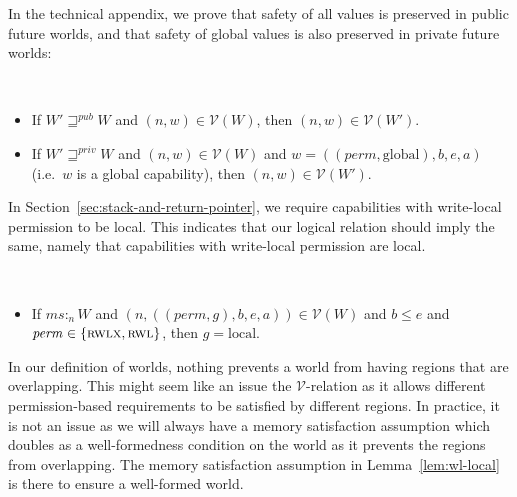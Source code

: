 \documentclass[format=acmsmall, review=true, screen=true]{acmart}
\renewcommand{\sectionname}{Section}
\newcommand{\var}[1]{\mathit{#1}}
\newcommand{\hs}{\var{ms}}
\newcommand{\ms}{\hs}
\newcommand{\gl}{\var{g}}
\newcommand{\addr}{\var{a}}
\newcommand{\start}{\var{b}}
\newcommand{\addrend}{\var{e}}
\newcommand{\heap}{\var{mem}}
\newcommand{\perm}{\var{perm}}
\newcommand{\stdcap}[1][(\perm,\gl)]{\left(#1,\start,\addrend,\addr \right)}
\newcommand{\futurewk}{\mathbin{\sqsupseteq}^{\var{pub}}}
\newcommand{\futurestr}{\mathbin{\sqsupseteq}^{\var{priv}}}
\newcommand{\heapSat}[3][\heap]{#1 :_{#2} #3}
\newcommand{\memSat}[3][n]{\heapSat[#2]{#1}{#3}}
\newcommand{\asmType}{\plaindom{AsmType}}
\newcommand{\plaindom}[1]{\mathrm{#1}}
\newcommand{\intr}[2]{\mathcal{#1}}
\newcommand{\valueintr}[1]{\intr{V}{#1}}
\newcommand{\stdvr}{\valueintr{\asmType}}
\newcommand{\npair}[2][n]{\left(#1,#2 \right)}
\newcommand{\plainperm}[1]{\textsc{#1}}
\newcommand{\readwritel}{\plainperm{rwl}}
\newcommand{\rwl}{\readwritel}
\newcommand{\rwlx}{\plainperm{rwlx}}
\newcommand{\plainlocality}[1]{\mathrm{#1}}
\newcommand{\local}{\plainlocality{local}}
\newcommand{\glob}{\plainlocality{global}}
\newenvironment{toplas}%
    {\color{OliveGreen}}{}
\begin{document}
In the technical appendix, we prove that safety of all values is
preserved in public future worlds, and that safety of global values is
also preserved in private future worlds:
\begin{lemma}~
  \begin{itemize}
  \item If $W' \futurewk W$ and $\npair{w} \in \stdvr(W)$, then $\npair{w} \in
    \stdvr(W')$.
  \item If $W' \futurestr W$ and $\npair{w} \in \stdvr(W)$ and $w =
    \stdcap[(\perm,\glob)]$ (i.e.\ $w$ is a global capability), then $\npair{w}
    \in \stdvr(W')$.
  \end{itemize}
\end{lemma}

\begin{toplas}
  In \sectionname~\ref{sec:stack-and-return-pointer}, we require capabilities with write-local permission to be local.
  This indicates that our logical relation should imply the same, namely that capabilities with write-local permission are local.
  \begin{lemma}~
    \label{lem:wl-local}
    \begin{itemize}
    \item If $\memSat{\ms}{W}$ and $\npair{\stdcap} \in \stdvr(W)$ and $\start
      \leq \addrend$ and $\perm \in \{\rwlx,\rwl\}$, then $\gl = \local$.
    \end{itemize}
  \end{lemma}
  In our definition of worlds, nothing prevents a world from having regions that are overlapping.
  This might seem like an issue the $\stdvr$-relation as it allows different permission-based requirements to be satisfied by different regions.
  In practice, it is not an issue as we will always have a memory satisfaction assumption which doubles as a well-formedness condition on the world as it prevents the regions from overlapping.
  The memory satisfaction assumption in Lemma~\ref{lem:wl-local} is there to ensure a well-formed world.
\end{toplas}
\end{document}
